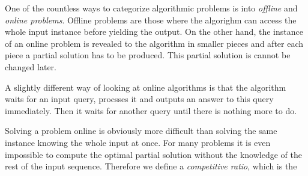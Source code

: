 One of the countless ways to categorize algorithmic problems is into
\emph{offline} and \emph{online problems}. Offline problems are those
where the algorighm can access the whole input instance before yielding
the output.  On the other hand, the instance of an online problem is
revealed to the algorithm in smaller pieces and after each piece a partial
solution has to be produced. This partial solution is cannot be changed
later.

A slightly different way of looking at online algorithms is that the
algorithm waits for an input query, procsses it and outputs an answer to
this query immediately. Then it waits for another query until there is
nothing more to do.

Solving a problem online is obviously more difficult than solving the same
instance knowing the whole input at once. For many problems it is even
impossible to compute the optimal partial solution without the knowledge
of the rest of the input sequence. Therefore we define a \emph{competitive
ratio}, which is the 

